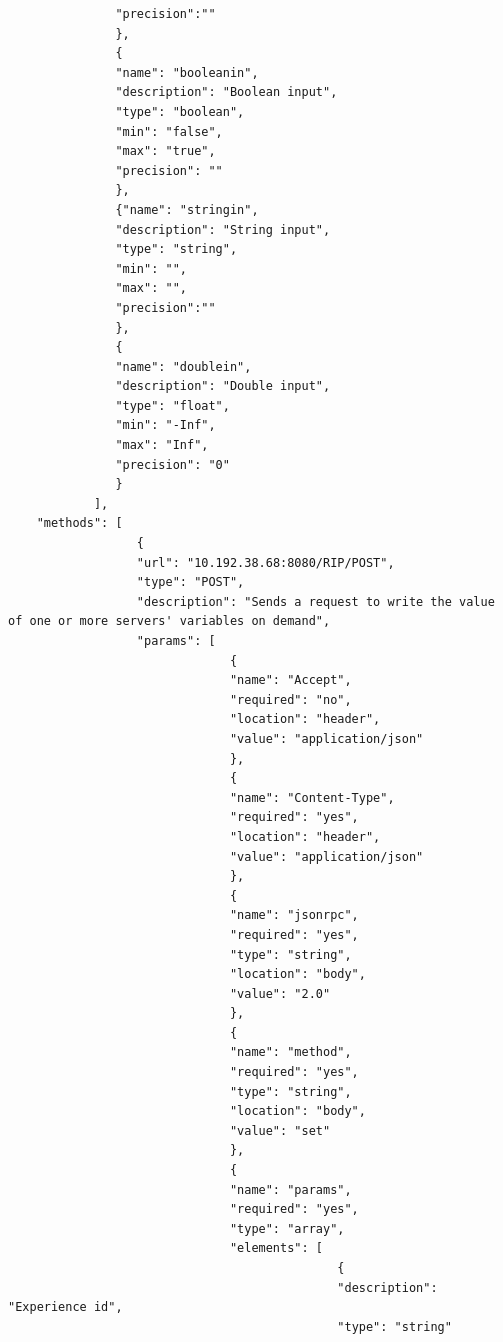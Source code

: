 \begin{lstlisting}
               "precision":""
               },
               {
               "name": "booleanin",
               "description": "Boolean input",
               "type": "boolean",
               "min": "false",
               "max": "true",
               "precision": ""
               },
               {"name": "stringin",
               "description": "String input",
               "type": "string",
               "min": "",
               "max": "",
               "precision":""
               },
               {
               "name": "doublein",
               "description": "Double input",
               "type": "float",
               "min": "-Inf",
               "max": "Inf",
               "precision": "0"
               }
            ],
    "methods": [
                  {
                  "url": "10.192.38.68:8080/RIP/POST",
                  "type": "POST",
                  "description": "Sends a request to write the value of one or more servers' variables on demand",
                  "params": [
                               {
                               "name": "Accept",
                               "required": "no",
                               "location": "header",
                               "value": "application/json"
                               },
                               {
                               "name": "Content-Type",
                               "required": "yes",
                               "location": "header",
                               "value": "application/json"
                               },
                               {
                               "name": "jsonrpc",
                               "required": "yes",
                               "type": "string",
                               "location": "body",
                               "value": "2.0"
                               },
                               {
                               "name": "method",
                               "required": "yes",
                               "type": "string",
                               "location": "body",
                               "value": "set"
                               },
                               {
                               "name": "params",
                               "required": "yes",
                               "type": "array",
                               "elements": [
                                              {
                                              "description": "Experience id",
                                              "type": "string"

\end{lstlisting}
